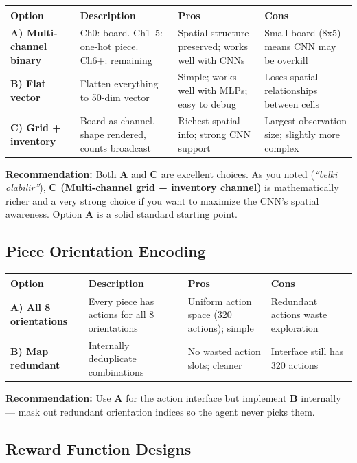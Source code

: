 \documentclass[11pt,a4paper]{article}
\begin{document}
\noindent
\begin{tabular}{|l|p{3.5cm}|p{3.5cm}|p{3.5cm}|}
\hline
\textbf{Option} & \textbf{Description} & \textbf{Pros} & \textbf{Cons} \\
\hline
\textbf{A) Multi-channel binary} & Ch0: board. Ch1--5: one-hot piece. Ch6+: remaining & Spatial structure preserved; works well with CNNs & Small board (8x5) means CNN may be overkill \\
\hline
\textbf{B) Flat vector} & Flatten everything to 50-dim vector & Simple; works well with MLPs; easy to debug & Loses spatial relationships between cells \\
\hline
\textbf{C) Grid + inventory} & Board as channel, shape rendered, counts broadcast & Richest spatial info; strong CNN support & Largest observation size; slightly more complex \\
\hline
\end{tabular}

\textbf{Recommendation:} Both \textbf{A} and \textbf{C} are excellent choices. As you noted (\textit{``belki olabilir''}), \textbf{C (Multi-channel grid + inventory channel)} is mathematically richer and a very strong choice if you want to maximize the CNN's spatial awareness. Option \textbf{A} is a solid standard starting point.

\subsection{Piece Orientation Encoding}

\noindent
\begin{tabular}{|l|p{3.5cm}|p{3.5cm}|p{3.5cm}|}
\hline
\textbf{Option} & \textbf{Description} & \textbf{Pros} & \textbf{Cons} \\
\hline
\textbf{A) All 8 orientations} & Every piece has actions for all 8 orientations & Uniform action space (320 actions); simple & Redundant actions waste exploration \\
\hline
\textbf{B) Map redundant} & Internally deduplicate combinations & No wasted action slots; cleaner & Interface still has 320 actions \\
\hline
\end{tabular}

\textbf{Recommendation:} Use \textbf{A} for the action interface but implement \textbf{B} internally --- mask out redundant orientation indices so the agent never picks them.

\subsection{Reward Function Designs}
\end{document}
